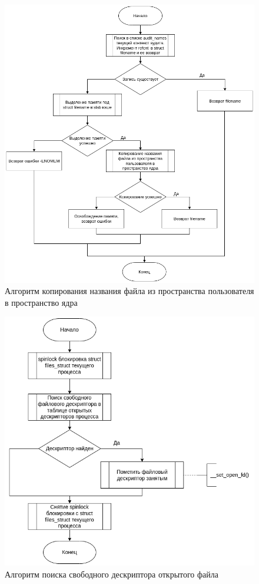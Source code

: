 \documentclass[12pt,a4paper]{scrreprt}
\begin{document}
\begin{figure}[H]
	\centering
	\includegraphics[scale=0.41]{pics/3.png}
	\caption{Алгоритм копирования названия файла из пространства пользователя в пространство ядра}
\end{figure}	

\begin{figure}[H]
	\centering
	\includegraphics[scale=0.45]{pics/4.png}
	\caption{Алгоритм поиска свободного дескриптора открытого файла}
\end{figure}
\end{document}
